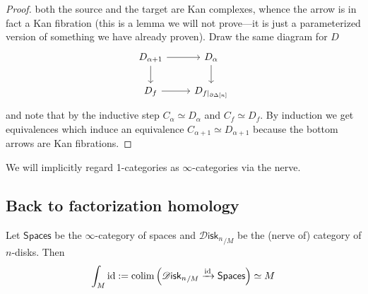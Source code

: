 \documentclass{amsart}
\newcommand{\Disk}{\mathscr{D}\mathsf{isk}_n}
\begin{document}
\begin{proof}
    both the source and the target are Kan complexes, whence the arrow is in fact a Kan
    fibration (this is a lemma we will not prove---it is just a parameterized version
    of something we have already proven). Draw the same diagram for $D$
    \begin{equation*}
        \begin{tikzcd}
            D_{\alpha+1}\rar\dar & D_\alpha\dar \\
            D_f \rar & D_{f|_{\partial\Delta[n]}}
        \end{tikzcd}
    \end{equation*}
    and note that by the inductive step $C_\alpha\simeq D_\alpha$ and $C_f\simeq D_f$.
    By induction we get equivalences which induce an equivalence $C_{\alpha+1}\simeq D_{\alpha+1}$
    because the bottom arrows are Kan fibrations.
\end{proof}

We will implicitly regard 1-categories as $\infty$-categories via the nerve.

\subsection{Back to factorization homology}

\begin{theorem}
    Let $\mathsf{Spaces}$ be the $\infty$-category of spaces and ${\Disk}_{/M}$
    be the (nerve of) category of $n$-disks. Then
    \begin{equation*}
        \int_M \id := \colim\left( {\Disk}_{/M}\xrightarrow{\id} \mathsf{Spaces} \right) \simeq M
    \end{equation*}
\end{theorem}
\end{document}
